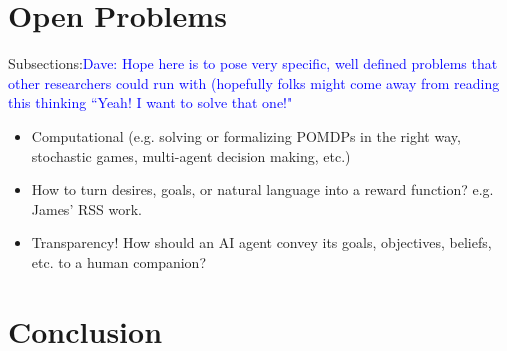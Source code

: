 \documentclass[11pt]{article}
\newcommand\davenote[1]{\textcolor{blue}{Dave: #1}}
\begin{document}
\section{Open Problems}

Subsections:\davenote{Hope here is to pose very specific, well defined problems that other researchers could run with (hopefully folks might come away from reading this thinking ``Yeah! I want to solve that one!"}
\begin{itemize}
\item Computational (e.g. solving or formalizing POMDPs in the right way, stochastic games, multi-agent decision making, etc.)
\item How to turn desires, goals, or natural language into a reward function? e.g. James' RSS work.
\item Transparency! How should an AI agent convey its goals, objectives, beliefs, etc. to a human companion?
\end{itemize}


\section{Conclusion}




\end{document}
